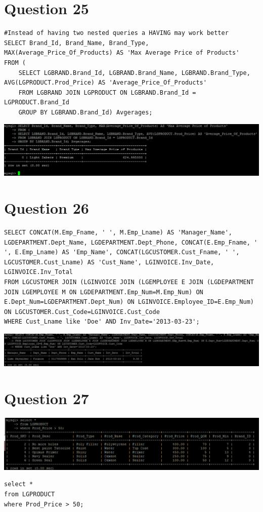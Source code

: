 \documentclass[a4paper,10pt]{article}
\begin{document}
\section {Question 25}
\lstset{
            language=SQL,
            breaklines=true
            }
        \begin{lstlisting}[frame=single]
        #Instead of having two nested queries a HAVING may work better
SELECT Brand_Id, Brand_Name, Brand_Type, MAX(Average_Price_Of_Products) AS 'Max Average Price of Products'
FROM (
	SELECT LGBRAND.Brand_Id, LGBRAND.Brand_Name, LGBRAND.Brand_Type, AVG(LGPRODUCT.Prod_Price) AS 'Average_Price_Of_Products'
	FROM LGBRAND JOIN LGPRODUCT ON LGBRAND.Brand_Id = LGPRODUCT.Brand_Id
	GROUP BY LGBRAND.Brand_Id) Avgerages;

        \end{lstlisting}
\includegraphics{Queries/Question_25/Question_25_screenshot.PNG}
\section {Question 26}
\lstset{
            language=SQL,
            breaklines=true
            }
        \begin{lstlisting}[frame=single]
        SELECT CONCAT(M.Emp_Fname, ' ', M.Emp_Lname) AS 'Manager_Name', LGDEPARTMENT.Dept_Name, LGDEPARTMENT.Dept_Phone, CONCAT(E.Emp_Fname, ' ', E.Emp_Lname) AS 'Emp_Name', CONCAT(LGCUSTOMER.Cust_Fname, ' ', LGCUSTOMER.Cust_Lname) AS 'Cust_Name', LGINVOICE.Inv_Date, LGINVOICE.Inv_Total
FROM LGCUSTOMER JOIN (LGINVOICE JOIN (LGEMPLOYEE E JOIN (LGDEPARTMENT JOIN LGEMPLOYEE M ON LGDEPARTMENT.Emp_Num=M.Emp_Num) ON E.Dept_Num=LGDEPARTMENT.Dept_Num) ON LGINVOICE.Employee_ID=E.Emp_Num) ON LGCUSTOMER.Cust_Code=LGINVOICE.Cust_Code
WHERE Cust_Lname like 'Doe' AND Inv_Date='2013-03-23';

        \end{lstlisting}
\includegraphics{Queries/Question_26/Q26_screenshot.jpg}
\section {Question 27}
\includegraphics{Queries/Question_27/Question_27_screenshot.PNG}
\lstset{
            language=SQL,
            breaklines=true
            }
        \begin{lstlisting}[frame=single]
        select * 
from LGPRODUCT 
where Prod_Price > 50;
        \end{lstlisting}
\end{document}
